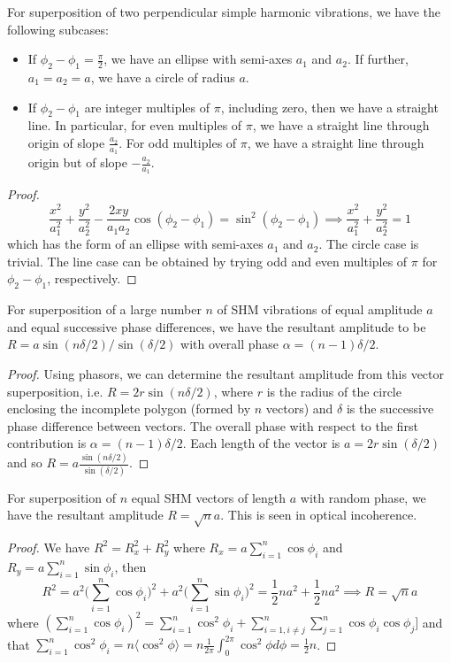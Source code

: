 \documentclass[a4paper]{article}
\begin{document}
\begin{cor}
For superposition of two perpendicular simple harmonic vibrations, we have the following subcases:
\begin{itemize}
    \item If $\phi_2-\phi_1=\frac{\pi}{2}$, we have an ellipse with semi-axes $a_1$ and $a_2$. If further, $a_1=a_2=a$, we have a circle of radius $a$.
    \item If $\phi_2-\phi_1$ are integer multiples of $\pi$, including zero, then we have a straight line. In particular, for even multiples of $\pi$, we have a straight line through origin of slope $\frac{a_2}{a_1}$. For odd multiples of $\pi$, we have a straight line through origin but of slope $-\frac{a_2}{a_1}$.
\end{itemize}
\end{cor}
\begin{proof}
$$\frac{x^2}{a_1^2}+\frac{y^2}{a_2^2}-\frac{2xy}{a_1a_2}\cos(\phi_2-\phi_1)=\sin^2(\phi_2-\phi_1)\implies\frac{x^2}{a_1^2}+\frac{y^2}{a_2^2}=1$$
which has the form of an ellipse with semi-axes $a_1$ and $a_2$. The circle case is trivial. The line case can be obtained by trying odd and even multiples of $\pi$ for $\phi_2-\phi_1$, respectively.
\end{proof}
\begin{cor}
For superposition of a large number $n$ of SHM vibrations of equal amplitude $a$ and equal successive phase differences, we have the resultant amplitude to be $R=a\sin(n\delta/2)/\sin(\delta/2)$ with overall phase $\alpha=(n-1)\delta/2$. 
\end{cor}
\begin{proof}
Using phasors, we can determine the resultant amplitude from this vector superposition, i.e. $R=2r\sin(n\delta/2)$, where $r$ is the radius of the circle enclosing the incomplete polygon (formed by $n$ vectors) and $\delta$ is the successive phase difference between vectors. The overall phase with respect to the first contribution is $\alpha=(n-1)\delta/2$. Each length of the vector is $a=2r\sin(\delta/2)$ and so $R=a\frac{\sin(n\delta/2)}{\sin(\delta/2)}$.
\end{proof}
\begin{cor}
For superposition of $n$ equal SHM vectors of length $a$ with random phase, we have the resultant amplitude $R=\sqrt{n}a$. This is seen in optical incoherence.
\end{cor}
\begin{proof}
We have $R^2=R_x^2+R_y^2$ where $R_x=a\sum_{i=1}^n\cos\phi_i$ and $R_y=a\sum_{i=1}^n\sin\phi_i$, then
$$R^2=a^2\bigg(\sum_{i=1}^n\cos\phi_i\bigg)^2+a^2\bigg(\sum_{i=1}^n\sin\phi_i\bigg)^2=\frac{1}{2}na^2+\frac{1}{2}na^2\implies R=\sqrt{n}a$$
where $(\sum_{i=1}^n\cos\phi_i)^2=\sum_{i=1}^n\cos^2\phi_i+\sum_{i=1,i\neq j}^n\sum_{j=1}^n\cos\phi_i\cos\phi_j]$ and that $\sum_{i=1}^n\cos^2\phi_i=n\langle\cos^2\phi\rangle=n\frac{1}{2\pi}\int_0^{2\pi}\cos^2\phi d\phi=\frac{1}{2}n$.
\end{proof}
\end{document}
